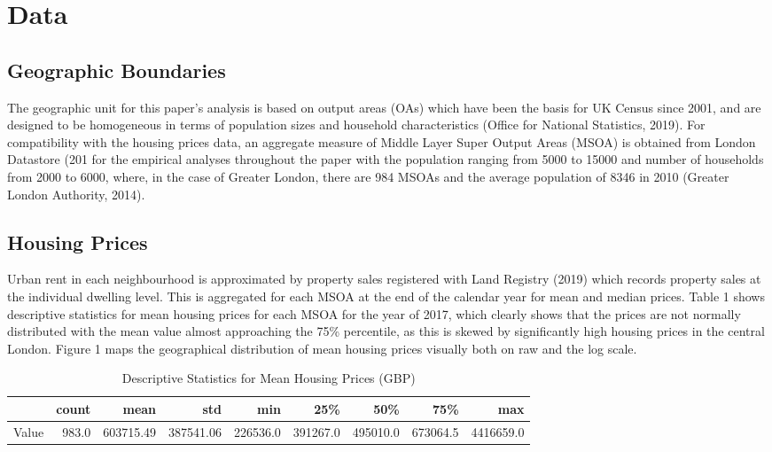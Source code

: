 \documentclass{article}
\begin{document}
\section{Data} \label{section:data}
\subsection{Geographic Boundaries}
The geographic unit for this paper's analysis is based on output areas (OAs) which have been the basis for UK Census since 2001, and are designed to be homogeneous in terms of population sizes and household characteristics (Office for National Statistics, 2019). For compatibility with the housing prices data, an aggregate measure of Middle Layer Super Output Areas (MSOA) is obtained from London Datastore (201 for the empirical analyses throughout the paper with the population ranging from 5000 to 15000 and number of households from 2000 to 6000, where, in the case of Greater London, there are 984 MSOAs and the average population of 8346 in 2010 (Greater London Authority, 2014).

\subsection{Housing Prices}
Urban rent in each neighbourhood is approximated by property sales registered with Land Registry (2019) which records property sales at the individual dwelling level. This is aggregated for each MSOA at the end of the calendar year for mean and median prices. Table 1 shows descriptive statistics for mean housing prices for each MSOA for the year of 2017, which clearly shows that the prices are not normally distributed with the mean value almost approaching the 75\% percentile, as this is skewed by significantly high housing prices in the central London. Figure 1 maps the geographical distribution of mean housing prices visually both on raw and the log scale.


\begin{table}[H]
\caption{Descriptive Statistics for Mean Housing Prices (GBP)} 
  \label{} 
\begin{tabular}{lrrrrrrrr}
\toprule
{} &  count &       mean &        std &       min &       25\% &       50\% &       75\% &        max \\
\midrule
Value &  983.0 &  603715.49 &  387541.06 &  226536.0 &  391267.0 &  495010.0 &  673064.5 &  4416659.0 \\
\bottomrule
\end{tabular}
\end{table}
\end{document}
